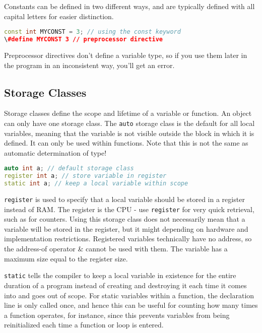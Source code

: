 \documentclass[10pt]{article}
\begin{document}
Constants can be defined in two different ways, and are typically defined with all capital letters for easier distinction.

\begin{lstlisting}[language=C++]
const int MYCONST = 3; // using the const keyword
\#define MYCONST 3 // preprocessor directive
\end{lstlisting}

Preprocessor directives don't define a variable type, so if you use them later in the program in an inconsistent way, you'll get an error. 

\subsection{Storage Classes}

Storage classes define the scope and lifetime of a variable or function. An object can only have one storage class. The \texttt{auto} storage class is the default for all local variables, meaning that the variable is not visible outside the block in which it is defined. It can only be used within functions. Note that this is not the same as automatic determination of type!

\begin{lstlisting}[language=C++]
auto int a; // default storage class
register int a; // store variable in register
static int a; // keep a local variable within scope
\end{lstlisting}

\texttt{register} is used to specify that a local variable should be stored in a register instead of RAM. The register is the CPU - use \texttt{register} for very quick retrieval, such as for counters. Using this storage class does not necessarily mean that a variable will be stored in the register, but it might depending on hardware and implementation restrictions. Registered variables technically have no address, so the address-of operator \& cannot be used with them. The variable has a maximum size equal to the register size.

\texttt{static} tells the compiler to keep a local variable in existence for the entire duration of a program instead of creating and destroying it each time it comes into and goes out of scope. For static variables within a function, the declaration line is only called once, and hence this can be useful for counting how many times a function operates, for instance, since this prevents variables from being reinitialized each time a function or loop is entered.
\end{document}
